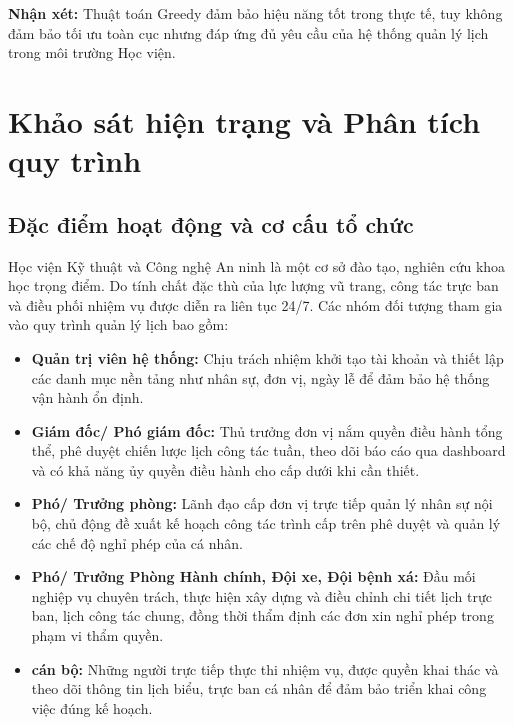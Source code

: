 \documentclass[18pt,a4paper]{report}
\begin{document}
\textbf{Nhận xét:}
Thuật toán Greedy đảm bảo hiệu năng tốt trong thực tế, tuy không đảm bảo tối ưu toàn cục nhưng đáp ứng đủ yêu cầu của hệ thống quản lý lịch trong môi trường Học viện.

\chapter{Khảo sát hiện trạng và Phân tích quy trình}

\section{Đặc điểm hoạt động và cơ cấu tổ chức}
Học viện Kỹ thuật và Công nghệ An ninh là một cơ sở đào tạo, nghiên cứu khoa học trọng điểm. Do tính chất đặc thù của lực lượng vũ trang, công tác trực ban và điều phối nhiệm vụ được diễn ra liên tục 24/7. Các nhóm đối tượng tham gia vào quy trình quản lý lịch bao gồm:

\begin{itemize}[leftmargin=1.2cm]
    \item \textbf{Quản trị viên hệ thống:} Chịu trách nhiệm khởi tạo tài khoản và thiết lập các danh mục nền tảng như nhân sự, đơn vị, ngày lễ để đảm bảo hệ thống vận hành ổn định.
    
    \item \textbf{Giám đốc/ Phó giám đốc:} Thủ trưởng đơn vị nắm quyền điều hành tổng thể, phê duyệt chiến lược lịch công tác tuần, theo dõi báo cáo qua dashboard và có khả năng ủy quyền điều hành cho cấp dưới khi cần thiết.
    
    \item \textbf{Phó/ Trưởng phòng:} Lãnh đạo cấp đơn vị trực tiếp quản lý nhân sự nội bộ, chủ động đề xuất kế hoạch công tác trình cấp trên phê duyệt và quản lý các chế độ nghỉ phép của cá nhân.
    
    \item \textbf{Phó/ Trưởng Phòng Hành chính, Đội xe, Đội bệnh xá:} Đầu mối nghiệp vụ chuyên trách, thực hiện xây dựng và điều chỉnh chi tiết lịch trực ban, lịch công tác chung, đồng thời thẩm định các đơn xin nghỉ phép trong phạm vi thẩm quyền.
    
    \item \textbf{cán bộ:} Những người trực tiếp thực thi nhiệm vụ, được quyền khai thác và theo dõi thông tin lịch biểu, trực ban cá nhân để đảm bảo triển khai công việc đúng kế hoạch.
\end{itemize}
\end{document}
